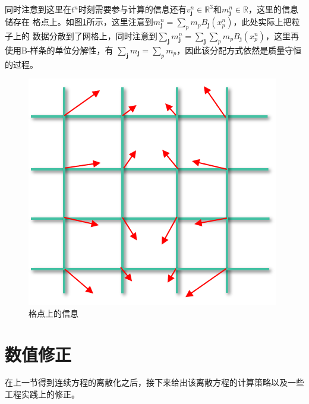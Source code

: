同时注意到这里在$t^n$时刻需要参与计算的信息还有$v_\mathbf{j}^n \in \mathbb{R}^3$和$m_\mathbf{j}^n \in \mathbb{R}$，这里的信息储存在
格点上。如图\ref{fig: grid information}所示，这里注意到$m_{\mathbf{j}}^n = \sum_p m_p B_{\mathbf{j}}(x_p^n)$，此处实际上把粒子上的
数据分散到了网格上，同时注意到$\sum_{\mathbf{j}} m_\mathbf{j}^n = \sum_{\mathbf{j}}\sum_p m_p B_{\mathbf{j}}(x_p^n)$，这里再使用B-样条的单位分解性，有
$\sum_{\mathbf{j}}m_\mathbf{j} = \sum_p m_p$，因此该分配方式依然是质量守恒的过程。
\begin{figure}[htbp]
    \centering
    \includegraphics[scale=0.7]{./images/image14.png}
    \caption{格点上的信息}
    \label{fig: grid information}
\end{figure}

\section{数值修正}
在上一节得到连续方程的离散化之后，接下来给出该离散方程的计算策略以及一些工程实践上的修正。
